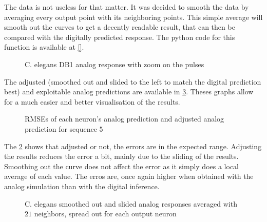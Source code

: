 The data is not useless for that matter. It was decided to smooth the data by averaging every output point with its neighboring points. This simple average will smooth out the curves to get a decently readable result, that can then be compared with the digitally predicted response. The python code for this function is available at \cref{}. %

\begin{figure}[H]
  \centering
  
  \caption{\acs{C. elegans} DB1 analog response with zoom on the pulses}
  \label{graph:zoom5Celegans}
\end{figure}

The adjusted (smoothed out and slided to the left to match the digital prediction best) and exploitable analog predictions are available in \cref{graph:smooth5Celegans}. Theses graphs allow for a much easier and better visualisation of the results.

\begin{figure}[H]
  \centering
  
  \caption{\acp{RMSE} of each neuron's analog prediction and adjusted analog prediction for sequence 5}
  \label{bar:rmse5}
\end{figure}

The \cref{bar:rmse5} shows that adjusted or not, the errors are in the expected range. Adjusting the results reduces the error a bit, mainly due to the sliding of the results. Smoothing out the curve does not affect the error as it simply does a local average of each value. The erros are, once again higher when obtained with the analog simulation than with the digital inference.

\begin{figure}[H]
  \centering
  \begin{minipage}{\columnwidth}
    \hfill
  \end{minipage}
  \begin{minipage}{\columnwidth}
    \hfill
  \end{minipage}
  \caption{\ac{C. elegans} smoothed out and slided analog responses averaged with $21$ neighbors, spread out for each output neuron}
  \label{graph:smooth5Celegans}
\end{figure}

